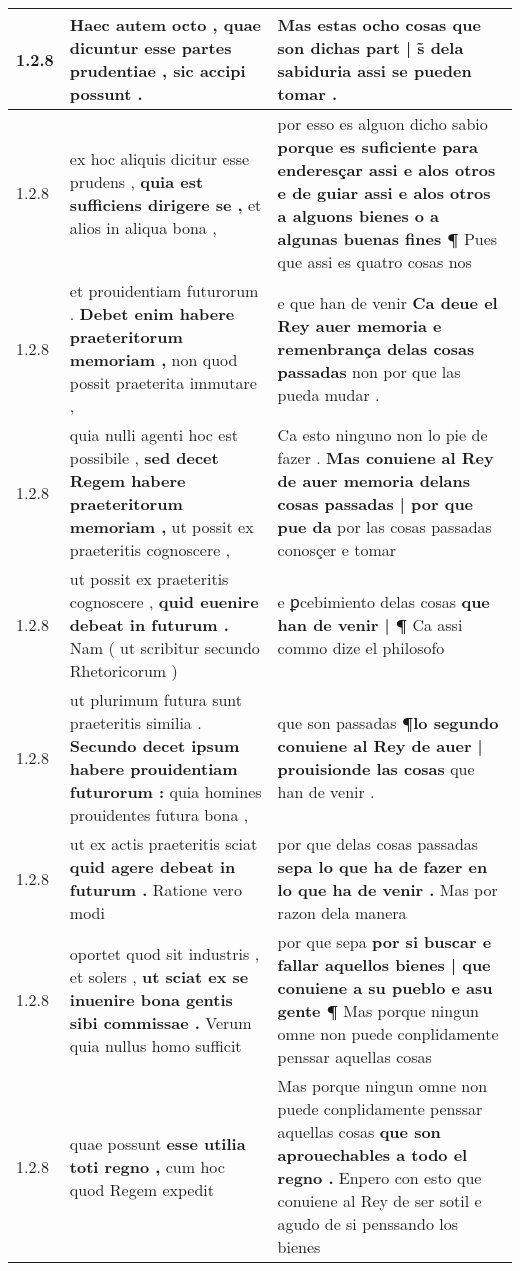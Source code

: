\begin{tabular}{|p{1cm}|p{6.5cm}|p{6.5cm}|}
1.2.8 & Haec autem octo , \textbf{ quae dicuntur esse partes prudentiae , } sic accipi possunt . & Mas estas ocho cosas \textbf{ que son dichas part | s̃ dela sabiduria } assi se pueden tomar . \\\hline
1.2.8 & ex hoc aliquis dicitur esse prudens , \textbf{ quia est sufficiens dirigere se , } et alios in aliqua bona , & por esso es alguon dicho sabio \textbf{ porque es suficiente para enderesçar assi e alos otros e de guiar assi e alos otros a alguons bienes o a algunas buenas fines ¶ } Pues que assi es quatro cosas nos \\\hline
1.2.8 & et prouidentiam futurorum . \textbf{ Debet enim habere praeteritorum memoriam , } non quod possit praeterita immutare , & e que han de venir \textbf{ Ca deue el Rey auer memoria e remenbrança delas cosas passadas } non por que las pueda mudar . \\\hline
1.2.8 & quia nulli agenti hoc est possibile , \textbf{ sed decet Regem habere praeteritorum memoriam , } ut possit ex praeteritis cognoscere , & Ca esto ninguno non lo pie de fazer . \textbf{ Mas conuiene al Rey de auer memoria delans cosas passadas | por que pue da } por las cosas passadas conosçer e tomar \\\hline
1.2.8 & ut possit ex praeteritis cognoscere , \textbf{ quid euenire debeat in futurum . } Nam ( ut scribitur secundo Rhetoricorum ) & e ꝑcebimiento delas cosas \textbf{ que han de venir | ¶ } Ca assi commo dize el philosofo \\\hline
1.2.8 & ut plurimum futura sunt praeteritis similia . \textbf{ Secundo decet ipsum habere prouidentiam futurorum : } quia homines prouidentes futura bona , & que son passadas \textbf{ ¶lo segundo conuiene al Rey de auer | prouisionde las cosas } que han de venir . \\\hline
1.2.8 & ut ex actis praeteritis sciat \textbf{ quid agere debeat in futurum . } Ratione vero modi & por que delas cosas passadas \textbf{ sepa lo que ha de fazer en lo que ha de venir . } Mas por razon dela manera \\\hline
1.2.8 & oportet quod sit industris , et solers , \textbf{ ut sciat ex se inuenire bona gentis sibi commissae . } Verum quia nullus homo sufficit & por que sepa \textbf{ por si buscar e fallar aquellos bienes | que conuiene a su pueblo e asu gente ¶ } Mas porque ningun omne non puede conplidamente penssar aquellas cosas \\\hline
1.2.8 & quae possunt \textbf{ esse utilia toti regno , } cum hoc quod Regem expedit & Mas porque ningun omne non puede conplidamente penssar aquellas cosas \textbf{ que son aprouechables a todo el regno . } Enpero con esto que conuiene al Rey de ser sotil e agudo de si penssando los bienes \\\hline

\end{tabular}
